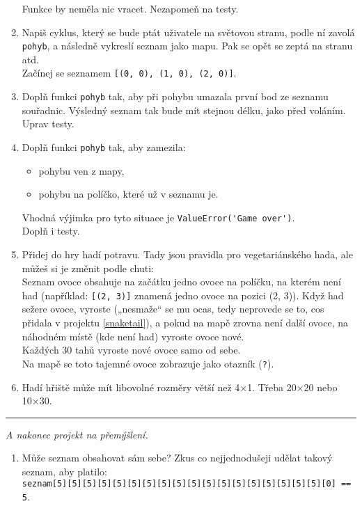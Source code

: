 \documentclass[a4paper,10pt]{article}
\newcommand\startsection[1]{
     \vspace{0.2ex}
    \hrule
    {\fontspec{Oxygen} \tiny
     \vspace{-1ex}
     \emph{#1}
     \vspace{-1.5em}
    }
}
\begin{document}
\begin{enumerate}[resume]
    Funkce by neměla nic vracet.
    Nezapomeň na testy.

\item Napiš cyklus, který se bude ptát uživatele na světovou stranu,
    podle ní zavolá \verb+pohyb+, a následně vykreslí seznam jako mapu.
    Pak se opět se zeptá na stranu atd.
    \\Začínej se seznamem \verb+[(0, 0), (1, 0), (2, 0)]+.

\item \label{snaketail}
    Doplň funkci \verb+pohyb+ tak, aby při pohybu umazala první bod ze seznamu
    souřadnic. Výsledný seznam tak bude mít stejnou délku, jako před voláním.
    \\Uprav testy.

\item Doplň funkci \verb+pohyb+ tak, aby zamezila:
    \begin{itemize}
    \item pohybu ven z mapy,
    \item pohybu na políčko, které už v seznamu je.
    \end{itemize}
    Vhodná výjimka pro tyto situace je \verb+ValueError('Game over')+.
    \\Doplň i testy.

\item Přidej do hry hadí potravu. Tady jsou pravidla pro vegetariánského hada,
    ale můžeš si je změnit podle chuti:
    \\ Seznam ovoce obsahuje na začátku jedno ovoce na políčku, na kterém není had
    (například: \texttt{[(2, 3)]} znamená jedno ovoce na pozici (2, 3)).
    Když had sežere ovoce, vyroste („nesmaže“ se mu ocas, tedy neprovede se to,
    cos přidala v projektu \ref{snaketail}),
    a pokud na mapě zrovna není další ovoce, na náhodném místě (kde není had) vyroste ovoce nové.
    \\Každých 30 tahů vyroste nové ovoce samo od sebe.
    \\Na mapě se toto tajemné ovoce zobrazuje jako otazník (\verb+?+).

\item \label{snakeend}
    Hadí hřiště může mít libovolné rozměry větší než 4×1.
    Třeba 20×20 nebo 10×30.

\end{enumerate}

\startsection{A nakonec projekt na přemýšlení.}

\begin{enumerate}[resume]

\item Může seznam obsahovat sám sebe? Zkus co nejjednodušeji udělat takový seznam, aby platilo:
    \\\verb+seznam[5][5][5][5][5][5][5][5][5][5][5][5][5][5][5][5][5][5][0] == 5+.

\end{enumerate}
\end{document}
